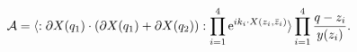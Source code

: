 \begin{equation}
{\cal A} = \langle : \partial X(q_1) \cdot (
\partial X(q_1) +
\partial X(q_2) ) : \prod_{i=1}^4 \hbox{e}^{i k_i \cdot X(z_i, \bar
z_i)} \rangle  \prod_{i=1}^4 { q -z_i\over y(z_i) } .
\end{equation}

